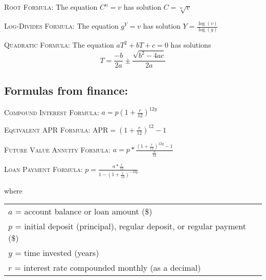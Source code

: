 \noindent \textsc{Root Formula:} \quad
The equation $C^n=v$ has solution $C= \sqrt[n]{v}$

 \bigskip
 
\noindent \textsc{Log-Divides Formula:} \quad
The equation $g^Y = v$ has solution $\displaystyle Y = \frac{\log (v)}{\log(g)}$

 \bigskip


\noindent \textsc{Quadratic Formula:} \quad The equation $aT^2+bT+c=0$ has solutions \\ $$T = \frac{-b}{2a} \pm \frac{\sqrt{b^2-4ac}}{2a}$$ 

\bigskip

\noindent \hrulefill

\vfill \vfill

\noindent \hrulefill
 
\subsection*{Formulas from finance:} \bigskip

\noindent \textsc{Compound Interest Formula:} \quad
$\displaystyle a = p \left( 1 + \frac{r}{12}\right) ^{12y}$ 

\bigskip

\noindent \textsc{Equivalent APR Formula:} \quad 
$\displaystyle \text{APR} = \left(1+\frac{r}{12}\right)^{12}-1$ 

\bigskip

\noindent  \textsc{Future Value Annuity Formula:} \quad
$\displaystyle a = p \ast \frac{\left( 1 + \frac{r}{12}\right) ^{12y}-1}{\frac{r}{12}}$ 

\bigskip

\noindent  \textsc{Loan Payment Formula:} \quad
$\displaystyle p = \frac{a  \ast \frac{r}{12}}{1-\left( 1 + \frac{r}{12}\right) ^{-12y}}$ 

\bigskip

\noindent  where 
\begin{center}
\begin{tabular} {l} 

$a$ = account balance or loan amount (\$) \\
$p$ = initial deposit (principal), regular deposit, or regular payment (\$) \\
$y$ = time invested (years)\\
$r$ = interest rate compounded monthly (as a decimal) \\ 
\end{tabular}
\end{center}

\noindent \hrulefill

\vfill



